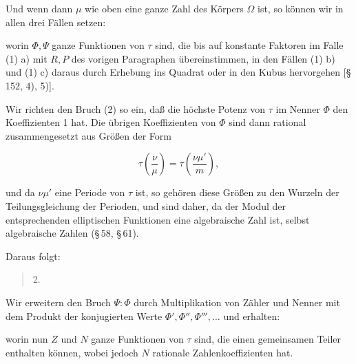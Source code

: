 

Und wenn dann $\mu$ wie oben eine ganze Zahl des Körpers $\Omega$ ist, so können wir in allen drei Fällen setzen:


worin $\Phi, \Psi$ ganze Funktionen von $\tau$ sind, die bis auf konstante Faktoren im Falle (1) a) mit $R, P$ des vorigen Paragraphen übereinstimmen, in den Fällen (1) b) und (1) c) daraus durch Erhebung ins Quadrat oder in den Kubus hervorgehen [§\,152, 4), 5)].

Wir richten den Bruch (2) so ein, daß die höchste Potenz von $\tau$ im Nenner $\Phi$ den Koeffizienten 1 hat. Die übrigen Koeffizienten von $\Phi$ sind dann rational zusammengesetzt aus Größen der Form

\[
\tau\left(\frac{\nu}{\mu}\right) = \tau\left(\frac{\nu \mu'}{m}\right),
\]

und da $\nu\mu'$ eine Periode von $\tau$ ist, so gehören diese Größen zu den Wurzeln der Teilungsgleichung der Perioden, und sind daher, da der Modul der entsprechenden elliptischen Funktionen eine algebraische Zahl ist, selbst algebraische Zahlen (§\,58, §\,61).

Daraus folgt:

\begin{quote}
2. 
\end{quote}

Wir erweitern den Bruch $\Psi : \Phi$ durch Multiplikation von Zähler und Nenner mit dem Produkt der konjugierten Werte $\Phi', \Phi'', \Phi''', \ldots$ und erhalten:


worin nun $Z$ und $N$ ganze Funktionen von $\tau$ sind, die einen gemeinsamen Teiler enthalten können, wobei jedoch $N$ rationale Zahlenkoeffizienten hat.
